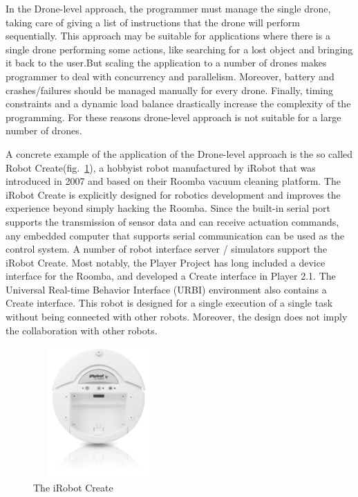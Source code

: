 In the Drone-level approach, the programmer must manage the single drone, taking care of giving a list of instructions that the drone will perform sequentially.
This approach may be suitable for applications where there is a single drone performing some actions, like searching for a lost object and bringing it back to the user.But scaling the application to a number of drones makes programmer to deal with  concurrency and parallelism. Moreover, battery and crashes/failures should be managed manually for every drone. Finally, timing constraints and a dynamic load balance drastically increase the complexity of the programming. For these reasons drone-level approach is not suitable for a large number of drones.

A concrete example of the application of the Drone-level approach is the so called Robot Create(fig.~\ref{fig:irobot}), a hobbyist robot manufactured by iRobot\cite{irobot} that was introduced in 2007 and based on their Roomba vacuum cleaning platform. The iRobot Create is explicitly designed for robotics development and improves the experience beyond simply hacking the Roomba. 
Since the built-in serial port supports the transmission of sensor data and can receive actuation commands, any embedded computer that supports serial communication can be used as the control system.
A number of robot interface server / simulators support the iRobot Create. Most notably, the Player Project has long included a device interface for the Roomba, and developed a Create interface in Player 2.1. The Universal Real-time Behavior Interface (URBI) environment also contains a Create interface.
This robot is designed for a single execution of a single task without being connected with other robots. Moreover, the design does not imply the collaboration with other robots.

\begin{figure}[H]
  \centering
  \includegraphics[width=5cm,height=5cm]{pictures/Irobot.png}
  \caption{The iRobot Create}
  \label{fig:irobot}
\end{figure}

